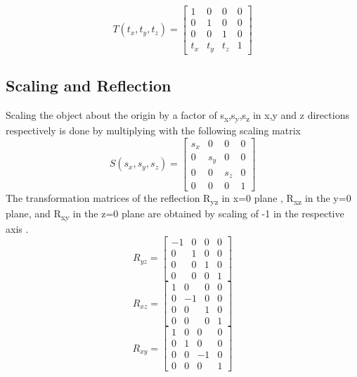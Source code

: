 \documentclass{article}
\begin{document}
\begin{equation}
    \label{simple_equation}
    T(t_x,t_y,t_z) = \begin{bmatrix}1 & 0 & 0 & 0 \\0 & 1 & 0 & 0 \\0 & 0 & 1 & 0 \\t_{x} & t_{y} & t _{z} & 1 \end{bmatrix}
\end{equation}

\subsection{Scaling and Reflection}
Scaling the object about the origin by a factor of s\textsubscript{x},s\textsubscript{y},s\textsubscript{z} in x,y and z directions respectively is done by multiplying with the following scaling matrix
\begin{equation}
    \label{simple_equation_2}
    S(s_x,s_y,s_z) = \begin{bmatrix}s_{x} & 0 & 0 & 0 \\0 & s_{y} & 0 & 0 \\0 & 0 & s_z & 0 \\0 & 0 & 0 & 1 \end{bmatrix}
\end{equation}
The transformation matrices of the reflection R\textsubscript{yz} in x=0 plane , R\textsubscript{xz} in the y=0 plane, and R\textsubscript{xy} in the z=0 plane are obtained by scaling of -1 in the respective axis .
\begin{equation}
    \label{simple_equation_3}
    R_{yz} = \begin{bmatrix}-1 & 0 & 0 & 0 \\0 & 1 & 0 & 0 \\0 & 0 & 1 & 0 \\0 & 0 & 0 & 1 \end{bmatrix}
    \end{equation}
    \begin{equation}
    \label{simple_equation_4}
    R_{xz} = \begin{bmatrix}1 & 0 & 0 & 0 \\0 & -1 & 0 & 0 \\0 & 0 & 1 & 0 \\0 & 0 & 0 & 1 \end{bmatrix}
    \end{equation}
    \begin{equation}
    \label{simple_equation_5}
    R_{xy} = \begin{bmatrix}1 & 0 & 0 & 0 \\0 & 1 & 0 & 0 \\0 & 0 & -1 & 0 \\0 & 0 & 0 & 1 \end{bmatrix}
\end{equation}
\end{document}

